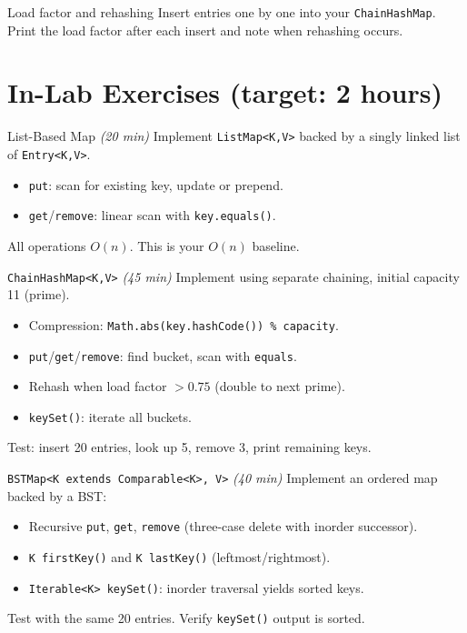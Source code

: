 \documentclass[11pt]{article}
\begin{document}
\begin{tryit}{Load factor and rehashing}
Insert entries one by one into your \texttt{ChainHashMap}.
Print the load factor after each insert and note when rehashing occurs.
\end{tryit}

\section*{In-Lab Exercises (target: 2 hours)}

\begin{labexercise}{List-Based Map \hfill {\small \itshape (20 min)}}
Implement \texttt{ListMap<K,V>} backed by a singly linked list of \texttt{Entry<K,V>}.
\begin{itemize}[leftmargin=*,nosep]
  \item \texttt{put}: scan for existing key, update or prepend.
  \item \texttt{get}/\texttt{remove}: linear scan with \texttt{key.equals()}.
\end{itemize}
All operations $O(n)$. This is your $O(n)$ baseline.
\end{labexercise}

\begin{labexercise}{\texttt{ChainHashMap<K,V>} \hfill {\small \itshape (45 min)}}
Implement using separate chaining, initial capacity 11 (prime).
\begin{itemize}[leftmargin=*,nosep]
  \item Compression: \texttt{Math.abs(key.hashCode()) \% capacity}.
  \item \texttt{put}/\texttt{get}/\texttt{remove}: find bucket, scan with \texttt{equals}.
  \item Rehash when load factor $> 0.75$ (double to next prime).
  \item \texttt{keySet()}: iterate all buckets.
\end{itemize}
Test: insert 20 entries, look up 5, remove 3, print remaining keys.
\end{labexercise}

\begin{labexercise}{\texttt{BSTMap<K extends Comparable<K>, V>} \hfill {\small \itshape (40 min)}}
Implement an ordered map backed by a BST:
\begin{itemize}[leftmargin=*,nosep]
  \item Recursive \texttt{put}, \texttt{get}, \texttt{remove} (three-case delete with inorder successor).
  \item \texttt{K firstKey()} and \texttt{K lastKey()} (leftmost/rightmost).
  \item \texttt{Iterable<K> keySet()}: inorder traversal yields sorted keys.
\end{itemize}
Test with the same 20 entries. Verify \texttt{keySet()} output is sorted.
\end{labexercise}
\end{document}
